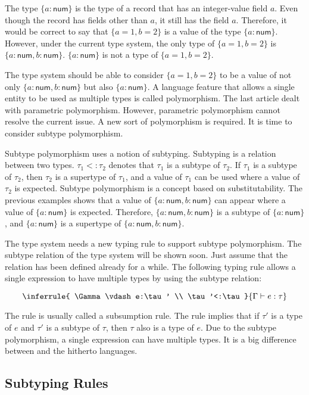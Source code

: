 The type $\{a:\textsf{num}\}$ is the type of a record that has an integer-value
field $a$. Even though the record has fields other than $a$, it still has
the field $a$. Therefore, it would be correct to say that $\{a=1,b=2\}$ is a
value of the type $\{a:\textsf{num}\}$. However, under the current type system,
the only type of $\{a=1,b=2\}$ is $\{a:\textsf{num},b:\textsf{num}\}$. \(\{a:\textsf{
num}\}\) is not a type of $\{a=1,b=2\}$.

The type system should be able to consider $\{a=1,b=2\}$ to be a value of not
only $\{a:\textsf{num},b:\textsf{num}\}$ but also $\{a:\textsf{num}\}$. A language
feature that allows a single entity to be used as multiple types is called
polymorphism. The last article dealt with parametric polymorphism. However,
parametric polymorphism cannot resolve the current issue. A new sort of
polymorphism is required. It is time to consider subtype polymorphism.

Subtype polymorphism uses a notion of subtyping. Subtyping is a relation between
two types. $\tau_1<:\tau_2$ denotes that $\tau_1$ is a subtype of
$\tau_2$. If $\tau_1$ is a subtype of $\tau_2$, then $\tau_2$ is a
supertype of $\tau_1$, and a value of $\tau_1$ can be used where a value of
$\tau_2$ is expected. Subtype polymorphism is a concept based on
substitutability. The previous examples shows that a value of \(\{a:\textsf{
num},b:\textsf{num}\}\) can appear where a value of $\{a:\textsf{num}\}$ is
expected. Therefore, $\{a:\textsf{num},b:\textsf{num}\}$ is a subtype of \(\{a:\textsf{
num}\}\), and $\{a:\textsf{num}\}$ is a supertype of \(\{a:\textsf{num},b:\textsf{
num}\}\).

The type system needs a new typing rule to support subtype polymorphism. The
subtype relation of the type system will be shown soon. Just assume that the
relation has been defined already for a while. The following typing rule allows
a single expression to have multiple types by using the subtype relation:

\[
\inferrule
{ \Gamma\vdash e:\tau' \\ \tau'<:\tau }
{ \Gamma\vdash e:\tau }
\]

The rule is usually called a subsumption rule. The rule implies that if
$\tau'$ is a type of $e$ and $\tau'$ is a subtype of $\tau$, then
$\tau$ also is a type of $e$. Due to the subtype polymorphism, a single
expression can have multiple types. It is a big difference between \lang and the
hitherto languages.

\subsection{Subtyping Rules}

